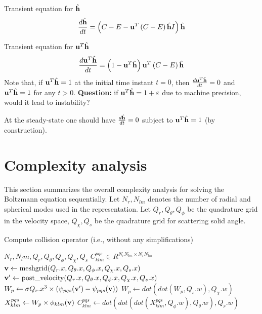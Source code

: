 \documentclass{article}[draft]
\begin{document}
Transient equation for $\hat{\mathbf{h}}$
\begin{align*}
\frac{d \hat{\mathbf{h}}}{dt} 
= \left( C - E - \mathbf{u}^T \left( C - E \right) \hat{\mathbf{h}} I \right) \hat{\mathbf{h}}
\end{align*}

Transient equation for $\mathbf{u}^T \hat{\mathbf{h}}$
\begin{align*}
\frac{d \mathbf{u}^T \hat{\mathbf{h}}}{dt} 
= \left( 1 - \mathbf{u}^T \hat{\mathbf{h}} \right) \mathbf{u}^T \left( C - E \right) \hat{\mathbf{h}}
\end{align*}
Note that, if $\mathbf{u}^T \hat{\mathbf{h}} = 1$ at the initial time instant $t=0$, then $\frac{d \mathbf{u}^T \hat{\mathbf{h}}}{dt} = 0$ and $\mathbf{u}^T \hat{\mathbf{h}} = 1$ for any $t>0$. \textbf{Question:} if $\mathbf{u}^T \hat{\mathbf{h}} = 1+\varepsilon$ due to machine precision, would it lead to instability?


At the steady-state one should have $\frac{d \hat{\mathbf{h}}}{dt} = 0$ subject to $\mathbf{u}^T \hat{\mathbf{h}} = 1$ (by construction).

\clearpage
\section{Complexity analysis}
This section summarizes the overall complexity analysis for solving the Boltzmann equation sequentially. Let $N_{r}, N_{lm}$ denotes the number of radial and spherical modes used in the representation. Let $Q_{r}, Q_{\theta}, Q_{\phi}$ be the quadrature grid in the velocity space, $Q_{\chi}, Q_{s}$ be the quadrature grid for scattering solid angle. 

\begin{algorithm}
	\caption{Compute collision operator (i.e., without any simplifications) \label{algo:full_cop}}
	\begin{algorithmic}
		\Require $N_r, N_lm, Q_r, Q_\theta, Q_\phi, Q_\chi, Q_s $
		\Ensure $C^{pqs}_{klm} \in R^{N_rN_{lm} \times N_rN_{lm}}$ 
		\State $\mathbf{v} \leftarrow \text{meshgrid}(Q_r.x, Q_\theta.x, Q_\phi.x, Q_\chi.x, Q_s.x)$
		\State $\mathbf{v^\prime} \leftarrow \text{post\_velocity}(Q_r.x, Q_\theta.x, Q_\phi.x, Q_\chi.x, Q_s.x)$
			\State $W_p \leftarrow \sigma Q_r.x^3 \times (\psi_{pqs}(\mathbf{v^\prime})  - \psi_{pqs}(\mathbf{v}))$
			\State $W_p\leftarrow dot(dot(W_p, Q_s.w), Q_\chi.w)$
					\State $X^{pqs}_{klm} \leftarrow W_p \times \phi_{klm} (\mathbf{v})$
					\State $C^{pqs}_{klm} \leftarrow dot(dot(dot(X^{pqs}_{klm}, Q_\phi.w),Q_\theta.w),Q_r.w)$
					\EndFor
				\EndFor
			\EndFor
		\EndFor
		\EndFor
	\end{algorithmic}
\end{algorithm}
\end{document}
